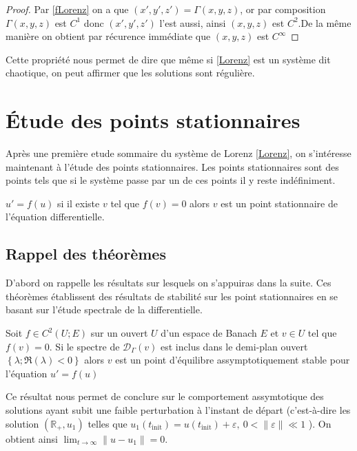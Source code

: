 \documentclass{article}
\newcommand{\R}{\mathbb{R}}
\newcommand{\cad}{c'est-\`a-dire }
\newtheorem[M]{prop}{Proposition}[section]
\newtheorem[M]{propt}{Propriété}[section]
\newtheorem[L]{thm}{Théoreme}
\newtheorem[L]{cor}{Corollaire}
\begin{document}
\begin{proof}
    Par \eqref{fLorenz} on a que $(x',y',z') = \Gamma(x,y,z)$, or par composition $\Gamma(x,y,z)$ est $C^1$ donc $(x',y',z')$ l'est aussi, ainsi $(x,y,z)$ est $C^2$.De la même manière on obtient par récurence immédiate que $(x,y,z)$ est $C^\infty$
\end{proof}

Cette propriété nous permet de dire que même si \eqref{Lorenz} est un système dit chaotique, on peut affirmer que les solutions sont régulière.

\section{\'Etude des points stationnaires}
Après une première etude sommaire du système de Lorenz \eqref{Lorenz}, on s'intéresse maintenant à l'étude des points stationnaires. Les points stationnaires sont des points tels que si le système passe par un de ces points il y reste indéfiniment.

\begin{thm}
    $u' = f(u)$ si il existe $v$ tel que $f(v)=0$ alors $v$ est un point stationnaire de l'équation differentielle.
\end{thm}

\subsection{Rappel des théorèmes}
D'abord on rappelle les résultats sur lesquels on s'appuiras dans la suite. Ces théorèmes établissent des résultats de stabilité sur les point stationnaires en se basant sur l'étude spectrale de la differentielle.
\begin{thm}
    Soit $f\in C^2(U;E)$ sur un ouvert $U$ d'un espace de Banach $E$ et $v\in U$ tel que $f(v)=0$. Si le spectre de $\mathcal{D}_\Gamma(v)$ est inclus dans le demi-plan ouvert $\left\{\lambda; \Re(\lambda)<0\right\}$ alors $v$ est un point d'équilibre assymptotiquement stable pour l'équation $u'=f(u)$
\end{thm}

Ce résultat nous permet de conclure sur le comportement assymtotique des solutions ayant subit une faible perturbation à l'instant de départ (\cad les solution $(\R_+,u_1)$ telles que $u_1(t_{\text{init}})=u(t_{\text{init}})+\varepsilon,\ 0<\|\varepsilon\|\ll 1 $ ). On obtient ainsi $\lim_{t\to\infty}\|u-u_1\| = 0$.

\end{document}
